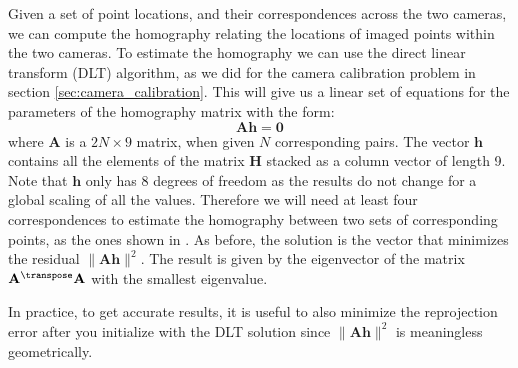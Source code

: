 Given a set of point locations, and their correspondences across the two cameras, we can compute the homography relating the locations of imaged points within the two cameras.  To estimate the homography we can use the direct linear transform (DLT) algorithm, as we did for the camera calibration problem in section \ref{sec:camera_calibration}. This will give us a linear set of equations for the parameters of the homography matrix with the form:
\begin{equation}
    \mathbf{A} \mathbf{h} = \mathbf{0}
\end{equation}
where $\mathbf{A}$ is a $2N \times 9$ matrix, when given $N$ corresponding pairs. The vector $\mathbf{h}$ contains all the elements of the matrix $\mathbf{H}$ stacked as a column vector of length 9. Note that $\mathbf{h}$ only has 8 degrees of freedom as the results do not change for a global scaling of all the values. Therefore we will need at least four correspondences to estimate the homography between two sets of corresponding points, as the ones shown in \fig{\ref{fig:fig_matching_two_images}}. As before, the solution is the vector that minimizes the residual $\|\mathbf{A} \mathbf{h} \|^2$. The result is given by the eigenvector of the matrix $\mathbf{A}^\transpose \mathbf{A}$ with the smallest eigenvalue.

In practice, to get accurate results, it is useful to also minimize the reprojection error after you initialize with the DLT solution since $\|\mathbf{A} \mathbf{h} \|^2$ is meaningless geometrically.



